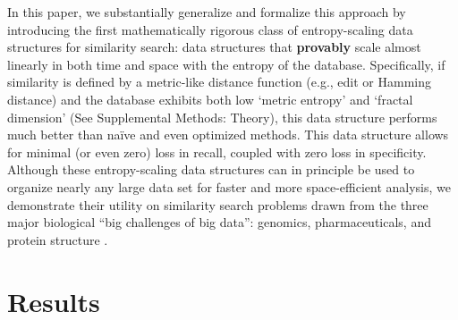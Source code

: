 \documentclass[review,preprint,12pt]{elsarticle}
\renewcommand{\cite}{\citep} %
\theoremstyle{definition}
\theoremstyle{remark}
\numberwithin{equation}{section}
\begin{document}
In this paper, we substantially generalize and formalize this approach by introducing the first mathematically rigorous class of entropy-scaling data structures for similarity search: data structures that \textbf{provably} scale almost linearly in both time and space with the entropy of the database.
Specifically, if similarity is defined by a metric-like distance function (e.g., edit or Hamming distance) and the database exhibits both low `metric entropy' and `fractal dimension' (See Supplemental Methods: Theory), this data structure performs much better than na\"ive and even optimized methods.
This data structure allows for minimal (or even zero) loss in recall, coupled
with zero loss in specificity.
Although these entropy-scaling data structures can in principle be used to organize nearly any large data set for faster and more space-efficient analysis,
we demonstrate their utility on similarity search problems drawn from the three major biological ``big challenges of big data'': genomics, pharmaceuticals, and protein structure \cite{marx2013biology}.

\section{Results}
\end{document}
